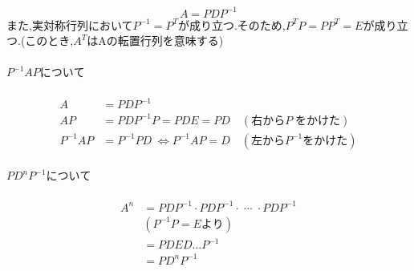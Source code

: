   \hspace{1em}
\begin{tcolorbox}[colframe=black!80,colback=white,title=適要]
\[
A=PDP^{-1}
\]
また,実対称行列において$P^{-1}=P^T$が成り立つ.そのため,$P^TP=PP^T=E$が成り立つ.(このとき,$A^T$はAの転置行列を意味する)
\paragraph{\;\small $P^{-1}APについて$}
\begin{align*}
  A &= PDP^{-1} \\
  AP & = PDP^{-1}P = PDE = PD \quad (右からP\;をかけた) \\
  P^{-1}AP &= P^{-1}PD \;\Leftrightarrow P^{-1}AP = D \quad (左からP^{-1}をかけた)
\end{align*}
\paragraph{\;\small $PD^nP^{-1}について$}
\begin{align*}
  A^n & = PDP^{-1} \cdot PDP^{-1}\cdot \; \cdots \; \cdot PDP^{-1} \\
      &(P^{-1}P=Eより)\\
      & = PDED \dots P^{-1} \\
      & = PD^nP^{-1}
\end{align*}
\end{tcolorbox}

